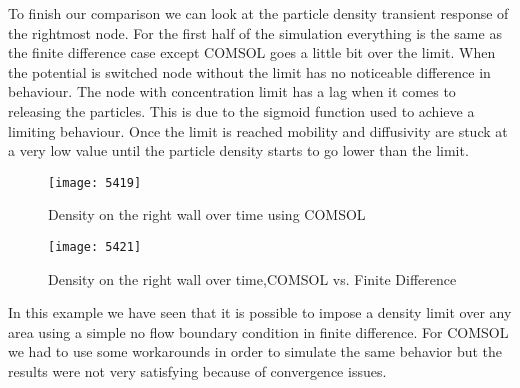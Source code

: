 To finish our comparison we can look at the particle density transient response of the rightmost node. For the first half of the simulation everything is the same as the finite difference case except COMSOL goes a little bit over the limit. When the potential is switched node without the limit has no noticeable difference in behaviour. The node with concentration limit has a lag when it comes to releasing the particles. This is due to the sigmoid function used to achieve a limiting behaviour. Once the limit is reached mobility and diffusivity are stuck at a very low value until the particle density starts to go lower than the limit.
\begin{figure}[ht]
\centering
\begin{minipage}[b]{0.45\linewidth}
\texttt{[image: 5419]}
\caption{Density on the right wall over time using COMSOL}
\label{5419}
\end{minipage}
\quad
\begin{minipage}[b]{0.45\linewidth}
\texttt{[image: 5421]}
\caption{Density on the right wall over time,COMSOL vs. Finite Difference}
\label{5421}
\end{minipage}
\end{figure}

In this example we have seen that it is possible to impose a density limit over any area using a simple no flow boundary condition in finite difference. For COMSOL we had to use some workarounds in order to simulate the same behavior but the results were not very satisfying because of convergence issues.